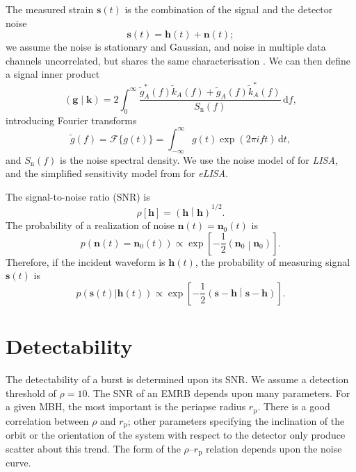 \documentclass[useAMS,usedcolumn,usegraphicx,usenatbib]{mn2e}
\newcommand{\sub}[1]{\ensuremath{_\mathrm{#1}}}
\newcommand{\dd}{\ensuremath{\mathrm{d}}}
\newcommand{\intd}[4]{\ensuremath{\int_{#1}^{#2}{#3}\,\dd{#4}}}
\newcommand{\recip}[1]{\ensuremath{\frac{1}{#1}}}
\newcommand{\innerprod}[2]{\ensuremath{\left({#1}\middle|{#2}\right)}}
\begin{document}
The measured strain $\boldsymbol{s}(t)$ is the combination of the signal and the detector noise
\begin{equation}
\boldsymbol{s}(t) = \boldsymbol{h}(t) + \boldsymbol{n}(t);
\end{equation}
we assume the noise is stationary and Gaussian, and noise in multiple data channels uncorrelated, but shares the same characterisation \citep{Cutler1998}. We can then define a signal inner product\citep{Cutler1994}
\begin{equation}
\innerprod{\boldsymbol{g}}{\boldsymbol{k}} = 2\intd{0}{\infty}{\frac{\tilde{g}_A^\ast(f)\tilde{k}_A(f) + \tilde{g}_A(f)\tilde{k}_A^\ast(f)}{S\sub{n}(f)}}{f},
\label{eq:inner}
\end{equation}
introducing Fourier transforms
\begin{equation}
\tilde{g}(f) = \mathscr{F}\{g(t)\} = \intd{-\infty}{\infty}{g(t)\exp(2\pi i ft)}{t},
\end{equation}
and $S\sub{n}(f)$ is the noise spectral density. We use the noise model of \citet{Barack2004} for \textit{LISA}, and the simplified sensitivity model from \citet{Jennrich2011} for \textit{eLISA}.

The signal-to-noise ratio (SNR) is
\begin{equation}
\rho[\boldsymbol{h}] = \innerprod{\boldsymbol{h}}{\boldsymbol{h}}^{1/2}.
\label{eq:SNR}
\end{equation}
The probability of a realization of noise $\boldsymbol{n}(t) = \boldsymbol{n}_0(t)$ is
\begin{equation}
p(\boldsymbol{n}(t) = \boldsymbol{n}_0(t)) \propto \exp\left[-\recip{2}\innerprod{\boldsymbol{n}_0}{\boldsymbol{n}_0}\right].
\end{equation}
Therefore, if the incident waveform is $\boldsymbol{h}(t)$, the probability of measuring signal $\boldsymbol{s}(t)$ is
\begin{equation}
p(\boldsymbol{s}(t)|\boldsymbol{h}(t)) \propto \exp\left[-\recip{2}\innerprod{\boldsymbol{s}-\boldsymbol{h}}{\boldsymbol{s}-\boldsymbol{h}}\right].
\label{eq:sig_prob}
\end{equation}

\section{Detectability}\label{sec:SNR}

The detectability of a burst is determined upon its SNR. We assume a detection threshold of $\rho = 10$. The SNR of an EMRB depends upon many parameters. For a given MBH, the most important is the periapse radius $r\sub{p}$. There is a good correlation between $\rho$ and $r\sub{p}$; other parameters specifying the inclination of the orbit or the orientation of the system with respect to the detector only produce scatter about this trend. The form of the $\rho$--$r\sub{p}$ relation depends upon the noise curve.
\end{document}
